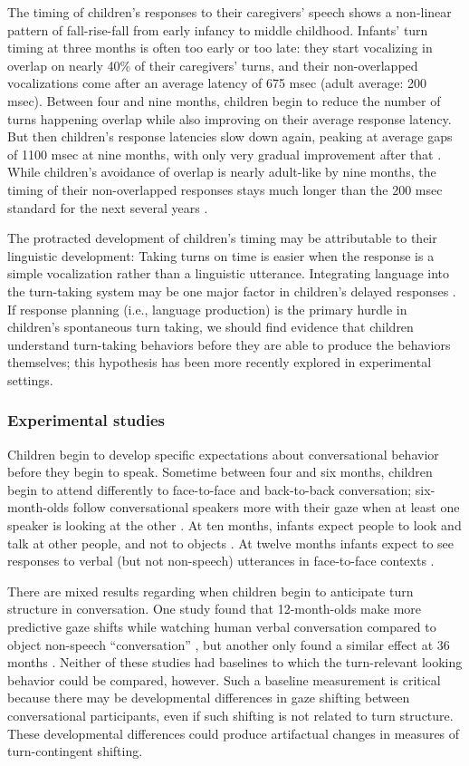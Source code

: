 \documentclass[authoryear, 12pt]{elsarticle}
\begin{document}
The timing of children's responses to their caregivers' speech shows a non-linear pattern of fall-rise-fall from early infancy to middle childhood. Infants' turn timing at three months is often too early or too late: they start vocalizing in overlap on nearly 40\% of their caregivers' turns, and their non-overlapped vocalizations come after an average latency of 675 msec (adult average: 200 msec). Between four and nine months, children begin to reduce the number of turns happening overlap while also improving on their average response latency. But then children's response latencies slow down again, peaking at average gaps of 1100 msec at nine months, with only very gradual improvement after that \citep{hilbrinkInPrep}. While children's avoidance of overlap is nearly adult-like by nine months, the timing of their non-overlapped responses stays much longer than the 200 msec standard for the next several years \citep{ervin-tripp1979}.

The protracted development of children's timing may be attributable to their linguistic development: Taking turns on time is easier when the response is a simple vocalization rather than a linguistic utterance. Integrating language into the turn-taking system may be one major factor in children's delayed responses \citep{casillasUndRev}. If response planning (i.e., language production) is the primary hurdle in children's spontaneous turn taking, we should find evidence that children understand turn-taking behaviors before they are able to produce the behaviors themselves; this hypothesis has been more recently explored in experimental settings.

\subsubsection{Experimental studies}

Children begin to develop specific expectations about conversational behavior before they begin to speak. Sometime between four and six months, children begin to attend differently to face-to-face and back-to-back conversation; six-month-olds follow conversational speakers more with their gaze when at least one speaker is looking at the other \citep{augusti2010}. At ten months, infants expect people to look and talk at other people, and not to objects \citep{beier2012}. At twelve months infants expect to see responses to verbal (but not non-speech) utterances in face-to-face contexts \citep{thorgrimssonUndRev}.

There are mixed results regarding when children begin to anticipate turn structure in conversation. One study found that 12-month-olds make more predictive gaze shifts while watching human verbal conversation compared to object non-speech ``conversation'' \citep{bakker2011}, but another only found a similar effect at 36 months \citep{hofsten2009}. Neither of these studies had baselines to which the turn-relevant looking behavior could be compared, however. Such a baseline measurement is critical because there may be developmental differences in gaze shifting between conversational participants, even if such shifting is not related to turn structure. These developmental differences could produce artifactual changes in measures of turn-contingent shifting. 
\end{document}
